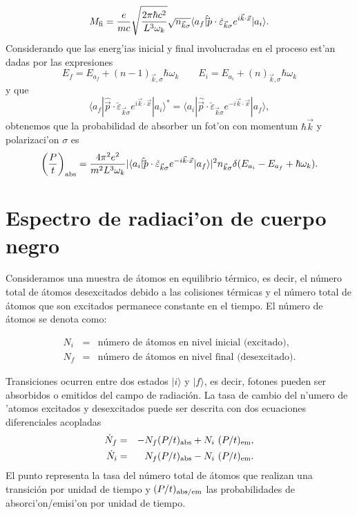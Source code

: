 \begin{equation}
M_{\rm fi}=\frac{e}{mc}\sqrt{\frac{2\pi\hbar c^2}{L^3\omega_k}}
\sqrt{n_{\vec{k}\sigma}}
\langle
a_f|{\hat\vec{p}}\cdot\check{\varepsilon}_{\vec{k}\sigma}e^{i\vec{k}\cdot\vec{x}
}|a_i\rangle .
\end{equation}
Considerando que las energ'ias inicial y final involucradas en el proceso est'an
dadas por las expresiones
\begin{equation}
E_f=E_{a_f}+(n-1)_{\vec{k},\sigma}\hbar\omega_k
\qquad
E_i=E_{a_i}+(n)_{\vec{k},\sigma}\hbar\omega_k
\end{equation}
y que
\begin{equation}
\langle
a_f|{\hat\vec{p}}\cdot\check{\varepsilon}_{\vec{k}\sigma}e^{i\vec{k}\cdot\vec{x}
}|a_i\rangle ^*=\langle
a_i|{\hat\vec{p}}\cdot\check{\varepsilon}_{\vec{k}\sigma}e^{-i\vec{k}\cdot\vec{x
}
}|a_f\rangle ,
\end{equation}
obtenemos que la probabilidad de absorber un fot'on con momentum $\hbar\vec{k}$
y polarizaci'on $\sigma$ es
\begin{equation}
\left( \frac{P}{t}\right)_{\rm abs} =\frac{4\pi^2e^2}{m^2L^3\omega_k}
|\langle
a_i|{\hat\vec{p}}\cdot\check{\varepsilon}_{\vec{k}\sigma}e^{-i\vec{k}\cdot\vec{x
}
}|a_f\rangle |^2n_{\vec{k}\sigma}\delta(E_{a_i}-E_{a_f}+\hbar\omega_k).
\end{equation}

\section{Espectro de radiaci'on de cuerpo negro}

Consideramos una muestra de \'atomos en equilibrio t\'ermico, es decir, el
n\'umero total de \'atomos desexcitados debido a las colisiones t\'ermicas y 
el n\'umero total de \'atomos que son excitados permanece constante en el
tiempo. El n\'umero de \'atomos se denota como: 

\begin{eqnarray}
N_i&=&\text{n\'umero de \'atomos en nivel inicial (excitado)} , \\
N_f&=&\text{n\'umero de \'atomos en nivel final (desexcitado)} .
\end{eqnarray} 

Transiciones ocurren entre dos estados $|i\rangle $ y $|f\rangle $, es
decir, fotones pueden ser absorbidos o emitidos del campo de radiaci\'on. La
tasa de cambio del n'umero de 'atomos excitados y desexcitados puede
ser descrita con dos ecuaciones diferenciales acopladas
\begin{eqnarray*}
\dot N_f  &=& - N_f (P/t)_{\rm abs}+ N_i \ (P/t)_{\rm em} ,\\
\dot N_i  &=&  N_f (P/t)_{\rm abs}- N_i \ (P/t)_{\rm em} .
\end{eqnarray*}
El punto representa la tasa del n\'umero total de \'atomos que realizan una
transici\'on  por unidad de tiempo y $(P/t)_{\rm abs/em}$ las probabilidades
de absorci'on/emisi'on por unidad de tiempo. 

